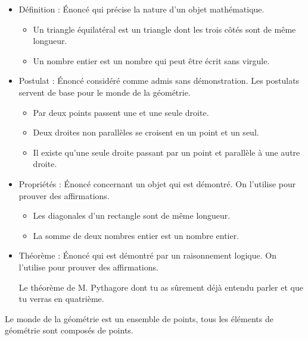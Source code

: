\documentclass[a4paper,dvipsnames]{article}
\begin{document}
\begin{His}
\begin{Def}
\begin{itemize}
\item \textcolor{sacado_orange}{Définition} : Énoncé qui précise la nature d'un objet mathématique.
\begin{Ex}
\begin{itemize}
\item Un triangle équilatéral est un triangle dont les trois côtés sont de même longueur.
\item Un nombre entier est un nombre qui peut être écrit sans virgule.
\end{itemize}
\end{Ex}
\item \textcolor{sacado_orange}{Postulat} : Énoncé considéré comme admis sans démonstration. Les postulats servent de base pour le monde de la géométrie.
\begin{Ex}
\begin{itemize}
\item Par deux points passent une et une seule droite.
\item Deux droites non parallèles se croisent en un point et un seul.
\item Il existe qu'une seule droite passant par un point et parallèle à une autre droite.
\end{itemize}
\end{Ex}
\item \textcolor{sacado_orange}{Propriétés} : Énoncé concernant un objet qui est démontré. On l'utilise pour prouver des affirmations.
\begin{Ex}
\begin{itemize}
\item Les diagonales d'un rectangle sont de même longueur.
\item La somme de deux nombres entier est un nombre entier.
\end{itemize}
\end{Ex}
\item \textcolor{sacado_orange}{Théorème} : Énoncé qui est démontré par un raisonnement logique. On l'utilise pour prouver des affirmations.
\begin{Ex}
Le théorème de M. Pythagore dont tu as sûrement déjà entendu parler et que tu verras en quatrième.
\end{Ex}
\end{itemize}
\end{Def}
\end{His}

\begin{Def}
Le monde de la géométrie est un ensemble de points, tous les éléments de géométrie sont composés de points.
\end{Def}
\end{document}
